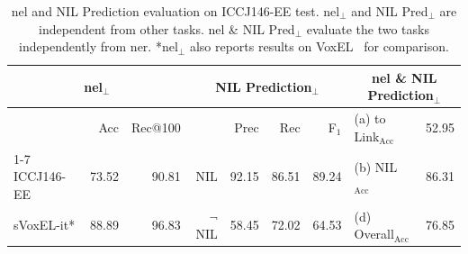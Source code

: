 
\begin{table}[tb]
\centering
\caption[\Ac{nel} and NIL Prediction evaluation on ICCJ146-EE test.]{\Ac{nel} and NIL Prediction evaluation on ICCJ146-EE test. \ac{nel}$_\perp$ and NIL Pred$_\perp$ are independent from other tasks. \ac{nel} \& NIL Pred$_\perp$ evaluate the two tasks independently from \ac{ner}. *\ac{nel}$_\perp$ also reports results on VoxEL~\cite{rosales2018voxel} for comparison. }
\label{tab:consolidation}
\begin{tabular*}{\textwidth}{lrr|rrrr|lr}
\toprule
\multicolumn{3}{c|}{\textbf{\Acl{nel}}$_\perp$} & \multicolumn{4}{c|}{\textbf{NIL Prediction}$_\perp$}    & \multicolumn{2}{c}{\textbf{\ac{nel} \& NIL Prediction}$_\perp$} \\
\midrule
      & Acc   & Rec@100 &         & Prec     & Rec     & F$_1$     & (a) to Link$_\mathrm{Acc}$           & 52.95          \\ \cline{1-7}
ICCJ146-EE  & 73.52 & 90.81   & NIL     & 92.15 & 86.51 & 89.24 & (b) NIL$_\mathrm{Acc}$            & 86.31          \\
sVoxEL-it* & 88.89 & 96.83 & $\neg$NIL & 58.45 & 72.02 & 64.53 & (d) Overall$_\mathrm{Acc}$            & 76.85 \\
\bottomrule
\end{tabular*}%
\end{table}